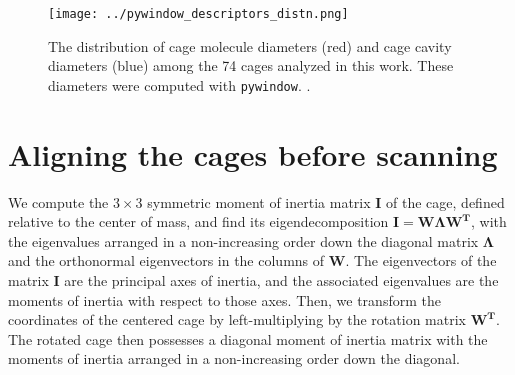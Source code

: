 \documentclass[journal=jacsat,manuscript=article]{achemso}
\begin{document}
\begin{figure}
\centering
	\texttt{[image: ../pywindow\_descriptors\_distn.png]}
	\caption{The distribution of cage molecule diameters (red) and cage cavity diameters (blue) among the 74 cages analyzed in this work. These diameters were computed with \texttt{pywindow}. \cite{miklitz2018pywindow}.
	} \label{fig:pywindow_descriptors_distn}
\end{figure}

\newpage
\clearpage

\section{Aligning the cages before scanning} 
\label{sec:alignment_details}
We compute the $3\times 3$ symmetric moment of inertia matrix $\mathbf{I}$ of the cage, defined relative to the center of mass, and find its eigendecomposition $\mathbf{I}=\mathbf{W}\mathbf{\Lambda}\mathbf{W^T}$, with the eigenvalues arranged in a non-increasing order down the diagonal matrix $\mathbf{\Lambda}$ and the orthonormal eigenvectors in the columns of $\mathbf{W}$. {\color{red} The eigenvectors of the matrix $\mathbf{I}$ are the principal axes of inertia, and the associated eigenvalues are the moments of inertia with respect to those axes.} Then, we transform the coordinates of the centered cage by left-multiplying by the rotation matrix $\mathbf{W^T}$. The rotated cage then possesses a diagonal moment of inertia matrix with the moments of inertia arranged in a non-increasing order down the diagonal.
\end{document}
